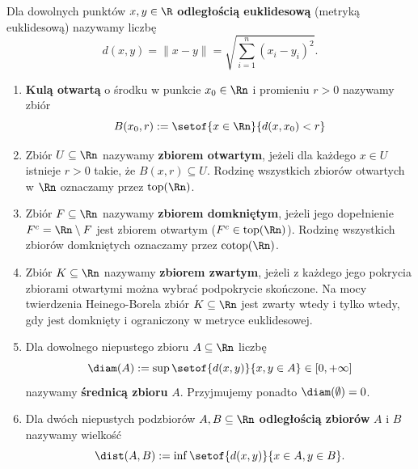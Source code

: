 \begin{defi}
    Dla dowolnych punktów $x, y \in \R$ \textbf{odległością euklidesową} (metryką euklidesową) nazywamy liczbę
    \begin{equation*}
        d(x, y) = \|x - y\| = \sqrt{\sum_{i=1}^n (x_i - y_i)^2}.
    \end{equation*}
    \begin{enumerate}
        \item \textbf{Kulą otwartą} o środku w punkcie $x_0 \in \Rn$ i promieniu $r > 0$ nazywamy zbiór
              \begin{equation*}
                  B(x_0, r) := \setof{x \in \Rn}{d(x, x_0) < r}
              \end{equation*}

        \item Zbiór $U \subseteq  \Rn$ nazywamy \textbf{zbiorem otwartym}, jeżeli dla każdego $x \in U$ istnieje $r > 0$ takie, że $B(x, r) \subseteq  U$.
              Rodzinę wszystkich zbiorów otwartych w $\Rn$ oznaczamy przez $\mathrm{top}(\Rn)$.

        \item Zbiór $F \subseteq  \Rn$ nazywamy \textbf{zbiorem domkniętym}, jeżeli jego dopełnienie $F^c = \Rn \setminus F$ jest zbiorem otwartym ($F^c \in \mathrm{top}(\Rn)$).
              Rodzinę wszystkich zbiorów domkniętych oznaczamy przez $\mathrm{cotop}(\Rn)$.

        \item Zbiór $K \subseteq  \Rn$ nazywamy \textbf{zbiorem zwartym}, jeżeli z każdego jego pokrycia zbiorami otwartymi można wybrać podpokrycie skończone. Na mocy twierdzenia Heinego-Borela zbiór $K \subseteq  \Rn$ jest zwarty wtedy i tylko wtedy, gdy jest domknięty i ograniczony w metryce euklidesowej.

        \item Dla dowolnego niepustego zbioru $A \subseteq \Rn$ liczbę
              \begin{equation*}
                  \diam(A) := \sup\setof{d(x, y)}{x, y \in A} \in [0, +\infty]
              \end{equation*} nazywamy \textbf{średnicą zbioru} $A$. Przyjmujemy ponadto $\diam(\emptyset) = 0$.
        \item Dla dwóch niepustych podzbiorów $A, B \subseteq \Rn$ \textbf{odległością zbiorów} $A$ i $B$ nazywamy wielkość
              \begin{equation*}
                  \dist(A, B) := \inf\setof{d(x, y)}{x \in A,  y \in B}.
              \end{equation*}
    \end{enumerate}
\end{defi}

